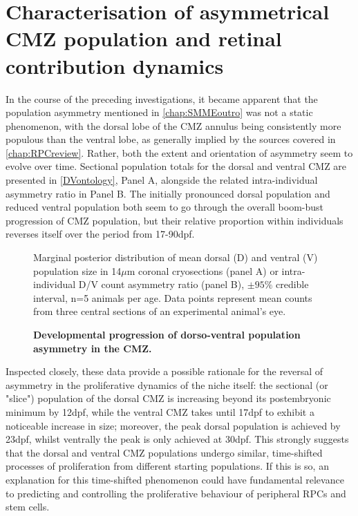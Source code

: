 \section{Characterisation of asymmetrical CMZ population and retinal contribution dynamics}

In the course of the preceding investigations, it became apparent that the population asymmetry mentioned in \autoref{chap:SMMEoutro} was not a static phenomenon, with the dorsal lobe of the CMZ annulus being consistently more populous than the ventral lobe, as generally implied by the sources covered in \autoref{chap:RPCreview}. Rather, both the extent and orientation of asymmetry seem to evolve over time. Sectional population totals for the dorsal and ventral CMZ are presented in \autoref{DVontology}, Panel A, alongside the related intra-individual asymmetry ratio in Panel B. The initially pronounced dorsal population and reduced ventral population both seem to go through the overall boom-bust progression of CMZ population, but their relative proportion within individuals reverses itself over the period from 17-90dpf. 

\begin{figure}[!h]
    \caption{{\bf Developmental progression of dorso-ventral population asymmetry in the CMZ.}}
    Marginal posterior distribution of mean dorsal (D) and ventral (V) population size in 14$\mu$m coronal cryosections (panel A) or intra-individual D/V count asymmetry ratio (panel B), $\pm 95\%$ credible interval, n=5 animals per age. Data points represent mean counts from three central sections of an experimental animal's eye. 
    \label{DVontology}
\end{figure}

Inspected closely, these data provide a possible rationale for the reversal of asymmetry in the proliferative dynamics of the niche itself: the sectional (or "slice") population of the dorsal CMZ is increasing beyond its postembryonic minimum by 12dpf, while the ventral CMZ takes until 17dpf to exhibit a noticeable increase in size; moreover, the peak dorsal population is achieved by 23dpf, whilst ventrally the peak is only achieved at 30dpf. This strongly suggests that the dorsal and ventral CMZ populations undergo similar, time-shifted processes of proliferation from different starting populations. If this is so, an explanation for this time-shifted phenomenon could have fundamental relevance to predicting and controlling the proliferative behaviour of peripheral RPCs and stem cells.

